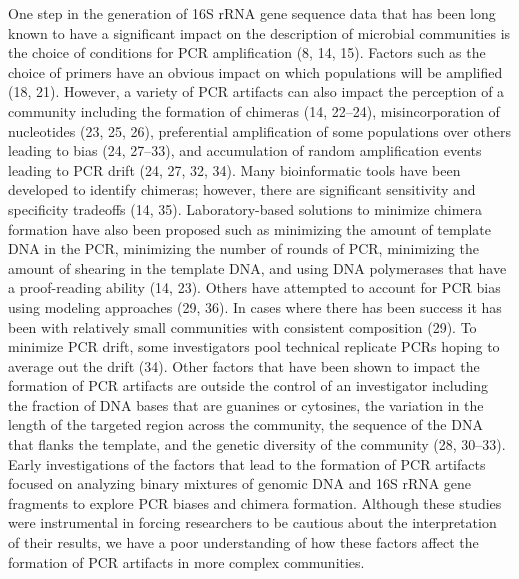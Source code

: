 \documentclass[11pt,]{article}
\begin{document}
One step in the generation of 16S rRNA gene sequence data that has been
long known to have a significant impact on the description of microbial
communities is the choice of conditions for PCR amplification (8, 14,
15). Factors such as the choice of primers have an obvious impact on
which populations will be amplified (18, 21). However, a variety of PCR
artifacts can also impact the perception of a community including the
formation of chimeras (14, 22--24), misincorporation of nucleotides (23,
25, 26), preferential amplification of some populations over others
leading to bias (24, 27--33), and accumulation of random amplification
events leading to PCR drift (24, 27, 32, 34). Many bioinformatic tools
have been developed to identify chimeras; however, there are significant
sensitivity and specificity tradeoffs (14, 35). Laboratory-based
solutions to minimize chimera formation have also been proposed such as
minimizing the amount of template DNA in the PCR, minimizing the number
of rounds of PCR, minimizing the amount of shearing in the template DNA,
and using DNA polymerases that have a proof-reading ability (14, 23).
Others have attempted to account for PCR bias using modeling approaches
(29, 36). In cases where there has been success it has been with
relatively small communities with consistent composition (29). To
minimize PCR drift, some investigators pool technical replicate PCRs
hoping to average out the drift (34). Other factors that have been shown
to impact the formation of PCR artifacts are outside the control of an
investigator including the fraction of DNA bases that are guanines or
cytosines, the variation in the length of the targeted region across the
community, the sequence of the DNA that flanks the template, and the
genetic diversity of the community (28, 30--33). Early investigations of
the factors that lead to the formation of PCR artifacts focused on
analyzing binary mixtures of genomic DNA and 16S rRNA gene fragments to
explore PCR biases and chimera formation. Although these studies were
instrumental in forcing researchers to be cautious about the
interpretation of their results, we have a poor understanding of how
these factors affect the formation of PCR artifacts in more complex
communities.
\end{document}
